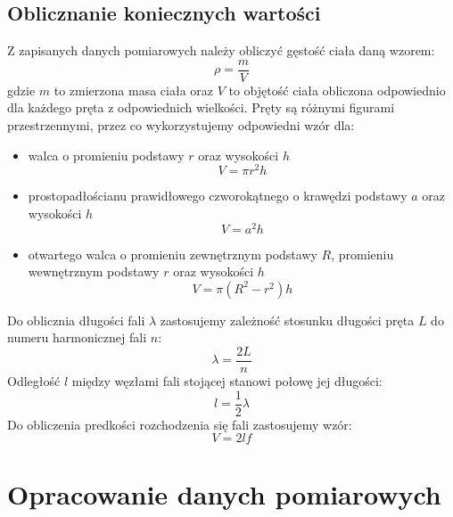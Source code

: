 \documentclass[a4paper,12pts]{article}
\begin{document}
\subsection{Oblicznanie koniecznych wartości}
Z zapisanych danych pomiarowych należy obliczyć gęstość ciała daną wzorem:
\begin{equation}
\rho = \frac{m}{V}
\end{equation}
gdzie $m$ to zmierzona masa ciała oraz $V$ to objętość ciała obliczona odpowiednio dla każdego pręta z odpowiednich wielkości. Pręty są różnymi figurami przestrzennymi, przez co wykorzystujemy odpowiedni wzór dla:
\begin{itemize}
	\item walca o promieniu podstawy $r$ oraz wysokości $h$
	\begin{equation}
	V = \pi r^2 h
	\end{equation}
	
	\item prostopadłościanu prawidłowego czworokątnego o krawędzi podstawy $a$ oraz wysokości $h$
	\begin{equation}
	V = a^2 h
	\end{equation}
	
	\item otwartego walca o promieniu zewnętrznym podstawy $R$, promieniu wewnętrznym podstawy $r$ oraz wysokości $h$
	\begin{equation}
	V = \pi (R^2 - r^2) h
	\end{equation}
\end{itemize}
Do oblicznia długości fali $\lambda$ zastosujemy zależność stosunku długości pręta $L$ do numeru harmonicznej fali $n$:
\begin{equation}
\lambda = \frac{2L}{n}
\end{equation}
Odległość $l$ między węzłami fali stojącej stanowi połowę jej długości:
\begin{equation}
l = \frac{1}{2} \lambda
\end{equation}
Do obliczenia predkości rozchodzenia się fali zastosujemy wzór:
\begin{equation}
V = 2lf
\end{equation}
\newpage
	
	\section{Opracowanie danych pomiarowych}
	
\end{document}
